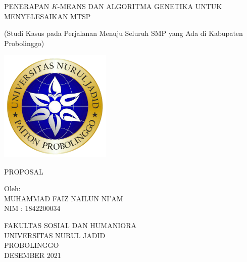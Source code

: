 \begin{titlepage}
   \begin{center}

       PENERAPAN $K$-MEANS DAN ALGORITMA GENETIKA UNTUK MENYELESAIKAN MTSP
       
       (Studi Kasus pada Perjalanan Menuju Seluruh SMP yang Ada di Kabupaten Probolinggo)

       \vfill
       
       \includegraphics[width=0.4\textwidth]{logo.png}
       
       \vfill
       
       PROPOSAL
       
       \vfill
       
       Oleh:\\
       MUHAMMAD FAIZ NAILUN NI'AM\\
       NIM : 1842200034

       \vfill
       
       FAKULTAS SOSIAL DAN HUMANIORA\\       
       UNIVERSITAS NURUL JADID\\
       PROBOLINGGO\\
       DESEMBER 2021
       
   \end{center}
\end{titlepage}